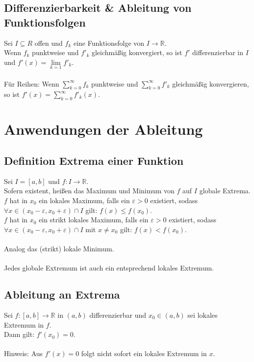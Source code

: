 \documentclass[halfparscip]{scrartcl}
\newcounter{subsection2}
\begin{document}
\subsection{Differenzierbarkeit \& Ableitung von Funktionsfolgen}
Sei $I \subseteq R$ offen und $f_k$ eine Funktionsfolge von $I \rightarrow \mathbb{R}$. \\
Wenn $f_k$ punktweise und $f'_k$ gleichmäßig konvergiert, so ist $f'$ differenzierbar in $I$ und $f'(x) = \lim\limits_{k=1}f'_k$.\\\\
Für Reihen: Wenn $\sum\limits_{k=0}^\infty f_k$ punktweise und $\sum\limits_{k=0}^\infty f'_k$ gleichmäßig konvergieren, so ist $f'(x) = \sum\limits_{k=0}^\infty f'_k(x)$.

\newpage
\section{Anwendungen der Ableitung}
\subsection{Definition Extrema einer Funktion}
Sei $I = [a,b]$ und $f:I\rightarrow\mathbb{R}$.\\
Sofern existent, heißen das Maximum und Minimum von $f$ auf $I$ globale Extrema.
$f$ hat in $x_0$ ein lokales Maximum, falls ein $\varepsilon > 0$ existiert, sodass $\forall x \in (x_0 - \varepsilon, x_0 + \varepsilon)\cap I$ gilt: $f(x) \leq f(x_0)$.\\
$f$ hat in $x_0$ ein strikt lokales Maximum, falls ein $\varepsilon > 0$ existiert, sodass $\forall x \in (x_0 - \varepsilon, x_0 + \varepsilon)\cap I$ mit $x \neq x_0$ gilt: $f(x) < f(x_0)$.\\\\
Analog das (strikt) lokale Minimum.\\\\
Jedes globale Extremum ist auch ein entsprechend lokales Extremum.

\subsection{Ableitung an Extrema}
Sei $f:[a,b] \rightarrow\mathbb{R}$ in $(a,b)$ differenzierbar und $x_0 \in (a,b)$ sei lokales Extremum in $f$.\\
Dann gilt: $f'(x_0) = 0$.\\\\
Hinweis: Aus $f'(x) = 0$ folgt nicht sofort ein lokales Extremum in $x$.
\end{document}
